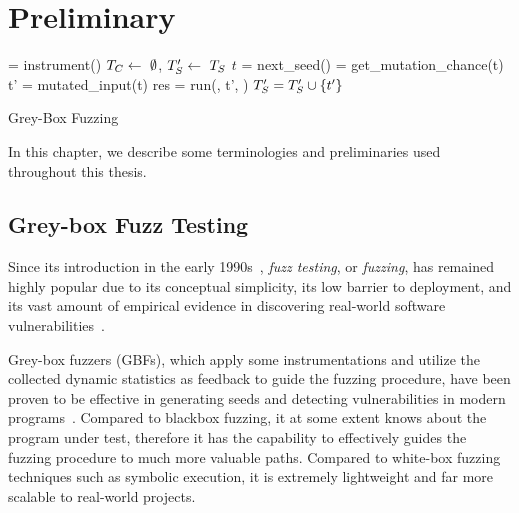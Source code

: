\chapter{Preliminary} \label{ch:preliminary}

\begin{algorithm}[t]
 \small
{}
	\Prog = instrument(\ProgO) 
	$T_{C} \leftarrow~\emptyset$, $T^{\prime}_{S} \leftarrow~T_{S}$\; 
	 {
		$t$ = next\_seed(\FinalSeeds) 
		\mutChance = get\_mutation\_chance(t)  \label{line:algo:energy}
		 {
			t' = mutated\_input(t)  
			res = run(\Prog, t', \Ncal)
			 {\label{line:algo:new_cov}
				$T^{\prime}_{S} = T^{\prime}_{S}\cup\{t'\}$  \label{line:algo:triage_end}
			}
		}
	}
	\caption{Grey-Box Fuzzing}\label{algo:gbf}
\end{algorithm}

In this chapter, we describe some terminologies and preliminaries used throughout this thesis.

\section{Grey-box Fuzz Testing}
Since its introduction in the early 1990s~\cite{fuzzing1990}, \emph{fuzz testing}, or \emph{fuzzing}, has remained highly popular due to its conceptual simplicity, its low barrier to deployment, and its vast amount of empirical evidence in discovering real-world software vulnerabilities~\cite{fuzz_survey}.

Grey-box fuzzers (GBFs), which apply some instrumentations and utilize the collected dynamic statistics as feedback to guide the fuzzing procedure, have been proven to be effective in generating seeds and detecting vulnerabilities in modern programs~\cite{fuzz_survey,afl,libfuzzer,Angora}. Compared to blackbox fuzzing, it at some extent knows about the program under test, therefore it has the capability to effectively guides the fuzzing procedure to much more valuable paths. Compared to white-box fuzzing techniques such as symbolic execution, it is extremely lightweight and far more scalable to real-world projects.



